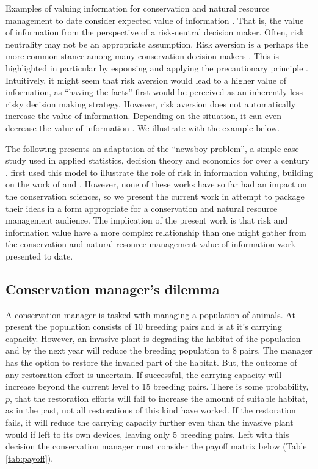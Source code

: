 \documentclass[]{article}
\theoremstyle{definition}
\theoremstyle{definition}
\theoremstyle{definition}
\theoremstyle{remark}
\begin{document}
Examples of valuing information for conservation and natural resource
management to date consider expected value of information
\citep[e.g.,][]{Moore2011, Runge2011, Johnson2014a, Canessa2015, Maxwell2015}.
That is, the value of information from the perspective of a risk-neutral
decision maker. Often, risk neutrality may not be an appropriate
assumption. Risk aversion is a perhaps the more common stance among many
conservation decision makers \citep{Tulloch2015}. This is highlighted in
particular by espousing and applying the precautionary principle
\citep{Johnson2012, Falcy2016}. Intuitively, it might seem that risk
aversion would lead to a higher value of information, as ``having the
facts'' first would be perceived as an inherently less risky decision
making strategy. However, risk aversion does not automatically increase
the value of information. Depending on the situation, it can even
decrease the value of information \citep{Gould1974}. We illustrate with
the example below.

The following presents an adaptation of the ``newsboy problem'', a
simple case-study used in applied statistics, decision theory and
economics for over a century \citep{Edgeworth1888}.
\citet{Eeckhoudt2000} first used this model to illustrate the role of
risk in information valuing, building on the work of \citet{Gould1974}
and \citet{Willinger1989}. However, none of these works have so far had
an impact on the conservation sciences, so we present the current work
in attempt to package their ideas in a form appropriate for a
conservation and natural resource management audience. The implication
of the present work is that risk and information value have a more
complex relationship than one might gather from the conservation and
natural resource management value of information work presented to date.

\subsection*{Conservation manager's
dilemma}\label{conservation-managers-dilemma}

A conservation manager is tasked with managing a population of animals.
At present the population consists of 10 breeding pairs and is at it's
carrying capacity. However, an invasive plant is degrading the habitat
of the population and by the next year will reduce the breeding
population to 8 pairs. The manager has the option to restore the invaded
part of the habitat. But, the outcome of any restoration effort is
uncertain. If successful, the carrying capacity will increase beyond the
current level to 15 breeding pairs. There is some probability, \(p\),
that the restoration efforts will fail to increase the amount of
suitable habitat, as in the past, not all restorations of this kind have
worked. If the restoration fails, it will reduce the carrying capacity
further even than the invasive plant would if left to its own devices,
leaving only 5 breeding pairs. Left with this decision the conservation
manager must consider the payoff matrix below (Table \ref{tab:payoff}).
\end{document}
